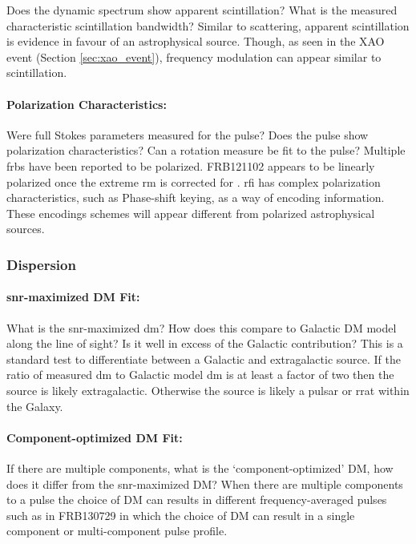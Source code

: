\documentclass[a4paper,fleqn,usenatbib]{mnras}
\begin{document}
Does the dynamic spectrum show apparent scintillation? What is the measured
characteristic scintillation bandwidth? Similar to scattering, apparent
scintillation is evidence in favour of an astrophysical source. Though, as seen
in the XAO event (Section \ref{sec:xao_event}), frequency modulation can appear
similar to scintillation.

\paragraph{Polarization Characteristics:}

Were full Stokes parameters measured for the pulse? Does the pulse show
polarization characteristics? Can a rotation measure be fit to the pulse?
Multiple \glspl{frb} have been reported to be polarized.  FRB121102 appears to
be linearly polarized once the extreme \gls{rm} is corrected for
\citep{2018Natur.553..182M}.  \gls{rfi} has complex polarization
characteristics, such as Phase-shift keying, as a way of encoding information.
These encodings schemes will appear different from polarized astrophysical
sources.

\subsubsection{Dispersion}

\paragraph{\gls{snr}-maximized DM Fit:}

What is the \gls{snr}-maximized \gls{dm}? How does this compare to Galactic DM
model along the line of sight? Is it well in excess of the Galactic
contribution? This is a standard test to differentiate between a Galactic and
extragalactic source. If the ratio of measured \gls{dm} to Galactic model
\gls{dm} is at least a factor of two then the source is likely extragalactic.
Otherwise the source is likely a pulsar or \gls{rrat} within the Galaxy.

\paragraph{Component-optimized DM Fit:}

If there are multiple components, what is the `component-optimized' DM, how does
it differ from the \gls{snr}-maximized DM? When there are multiple components to
a pulse the choice of DM can results in different frequency-averaged pulses such
as in FRB130729 in which the choice of DM can result in a single component or
multi-component pulse profile. 
\end{document}
